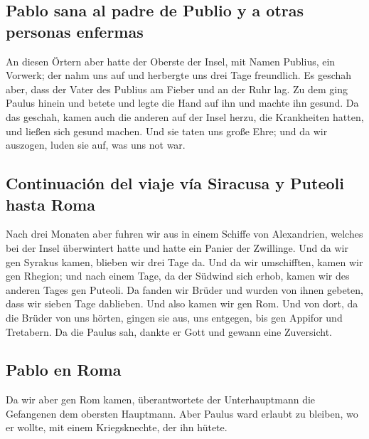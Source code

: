 \hypertarget{pablo-sana-al-padre-de-publio-y-a-otras-personas-enfermas}{%
\subsection{Pablo sana al padre de Publio y a otras personas
enfermas}\label{pablo-sana-al-padre-de-publio-y-a-otras-personas-enfermas}}

 An diesen Örtern aber hatte der Oberste der Insel, mit
Namen Publius, ein Vorwerk; der nahm uns auf und herbergte uns drei Tage
freundlich.  Es geschah aber, dass der Vater des Publius
am Fieber und an der Ruhr lag. Zu dem ging Paulus hinein und betete und
legte die Hand auf ihn und machte ihn gesund.  Da das
geschah, kamen auch die anderen auf der Insel herzu, die Krankheiten
hatten, und ließen sich gesund machen.  Und sie taten uns
große Ehre; und da wir auszogen, luden sie auf, was uns not war.

\hypertarget{continuaciuxf3n-del-viaje-vuxeda-siracusa-y-puteoli-hasta-roma}{%
\subsection{Continuación del viaje vía Siracusa y Puteoli hasta
Roma}\label{continuaciuxf3n-del-viaje-vuxeda-siracusa-y-puteoli-hasta-roma}}

 Nach drei Monaten aber fuhren wir aus in einem Schiffe
von Alexandrien, welches bei der Insel überwintert hatte und hatte ein
Panier der Zwillinge.  Und da wir gen Syrakus kamen,
blieben wir drei Tage da.  Und da wir umschifften, kamen
wir gen Rhegion; und nach einem Tage, da der Südwind sich erhob, kamen
wir des anderen Tages gen Puteoli.  Da fanden wir Brüder
und wurden von ihnen gebeten, dass wir sieben Tage dablieben. Und also
kamen wir gen Rom.  Und von dort, da die Brüder von uns
hörten, gingen sie aus, uns entgegen, bis gen Appifor und Tretabern. Da
die Paulus sah, dankte er Gott und gewann eine Zuversicht.

\hypertarget{pablo-en-roma}{%
\subsection{Pablo en Roma}\label{pablo-en-roma}}

 Da wir aber gen Rom kamen, überantwortete der
Unterhauptmann die Gefangenen dem obersten Hauptmann. Aber Paulus ward
erlaubt zu bleiben, wo er wollte, mit einem Kriegsknechte, der ihn
hütete.

